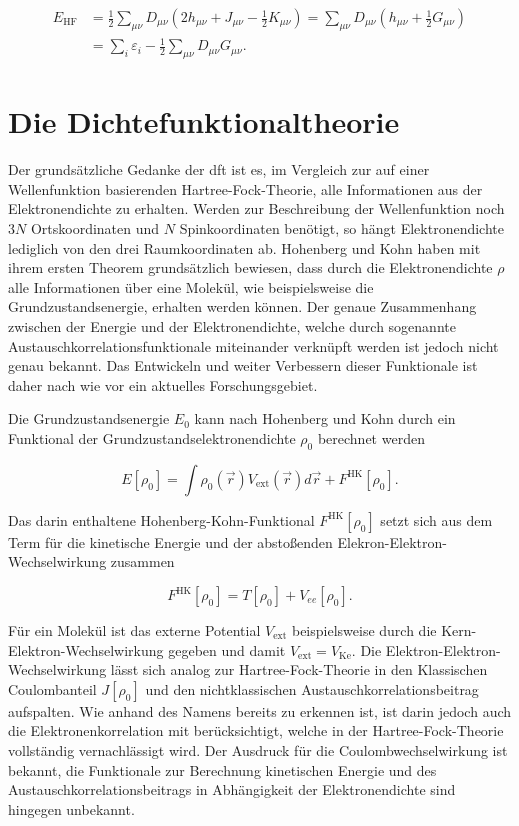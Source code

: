 \begin{equation}
\begin{aligned}
E_{\textrm{HF}}&=\frac{1}{2}\sum_{\mu\nu}D_{\mu\nu}(2h_{\mu\nu}+J_{\mu\nu}-\frac{1}{2} K_{\mu\nu})=\sum_{\mu\nu}D_{\mu\nu}(h_{\mu\nu}+\frac{1}{2}G_{\mu\nu})\\
&=\sum_i\varepsilon_i-\frac{1}{2}\sum_{\mu\nu}D_{\mu\nu}G_{\mu\nu}.
\end{aligned}
\label{hfenergie}
\end{equation}

\section{Die Dichtefunktionaltheorie}

Der grundsätzliche Gedanke der \ac{dft} ist es, im Vergleich zur auf einer Wellenfunktion basierenden Hartree-Fock-Theorie, alle Informationen aus der Elektronendichte zu erhalten. Werden zur Beschreibung der Wellenfunktion noch $3N$ Ortskoordinaten und $N$ Spinkoordinaten benötigt, so hängt Elektronendichte lediglich von den drei Raumkoordinaten ab. Hohenberg und Kohn\supercite{hohenberg1964inhomogeneous} haben mit ihrem ersten Theorem grundsätzlich bewiesen, dass durch die Elektronendichte $\rho$ alle Informationen über eine Molekül, wie beispielsweise die Grundzustandsenergie, erhalten werden können. Der genaue Zusammenhang zwischen der Energie und der Elektronendichte, welche durch sogenannte Austauschkorrelationsfunktionale miteinander verknüpft werden ist jedoch nicht genau bekannt. Das Entwickeln und weiter Verbessern dieser Funktionale ist daher nach wie vor ein aktuelles Forschungsgebiet.  

Die Grundzustandsenergie $E_0$ kann nach Hohenberg und Kohn durch ein Funktional der Grundzustandselektronendichte $\rho_0$ berechnet werden

\begin{equation}
	E[\rho_0]=\int\rho_0(\vec{r})V_{\textrm{ext}}(\vec{r})d\vec{r}+F^{\textrm{HK}}[\rho_0].
\end{equation}

Das darin enthaltene Hohenberg-Kohn-Funktional $F^{\textrm{HK}}[\rho_0]$ setzt sich aus dem Term für die kinetische Energie und der abstoßenden Elekron-Elektron-Wechselwirkung zusammen

\begin{equation}
	F^{\textrm{HK}}[\rho_0]=T[\rho_0]+V_{ee}[\rho_0].
\end{equation}

Für ein Molekül ist das externe Potential $V_{\textrm{ext}}$ beispielsweise durch die Kern-Elektron-Wechselwirkung gegeben und damit $V_{\textrm{ext}}=V_{\textrm{Ke}}$. Die Elektron-Elektron-Wechselwirkung lässt sich analog zur Hartree-Fock-Theorie in den Klassischen Coulombanteil $J[\rho_0]$ und den nichtklassischen Austauschkorrelationsbeitrag aufspalten. Wie anhand des Namens bereits zu erkennen ist, ist darin jedoch auch die Elektronenkorrelation mit berücksichtigt, welche in der Hartree-Fock-Theorie vollständig vernachlässigt wird. Der Ausdruck für die Coulombwechselwirkung ist bekannt, die Funktionale zur Berechnung kinetischen Energie und des Austauschkorrelationsbeitrags in Abhängigkeit der Elektronendichte sind hingegen unbekannt. 

